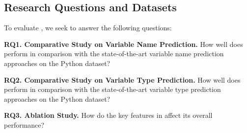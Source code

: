 \subsection{Research Questions and Datasets}

To evaluate {\tool}, we seek to answer the following questions:

\noindent\textbf{RQ1. Comparative Study on Variable Name Prediction.}  How well does {\tool} perform in comparison with the state-of-the-art variable name prediction approaches on the Python dataset?

\noindent\textbf{RQ2. Comparative Study on Variable Type Prediction.}  How well does {\tool} perform in comparison with the state-of-the-art variable type prediction approaches on the Python dataset?

\noindent\textbf{RQ3. Ablation Study.} How do the key features in {\tool} affect its overall performance?


